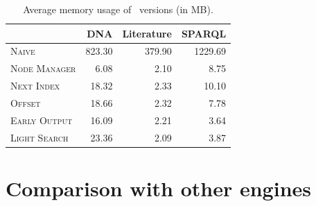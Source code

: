 \begin{table}[t]
	\begin{tabular}{l|rrr}
		                      & \textsf{DNA} & \textsf{Literature} &
		                      \textsf{SPARQL} \\
		\hline
		\textsc{Naive}        & 823.30        & 379.90               & 1229.69
		\\
		\textsc{Node Manager} & 6.08         & 2.10                 & 8.75 \\
		\textsc{Next Index}   & 18.32        & 2.33                & 10.10 \\
		\textsc{Offset}       & 18.66        & 2.32                & 7.78 \\
		\textsc{Early Output} & 16.09        & 2.21                & 3.64 \\
		\textsc{Light Search} & 23.36        & 2.09                & 3.87
	\end{tabular}
	\caption{Average memory usage of \rematch\ versions (in MB).}
	\label{tab-memory}
\end{table}

\section{Comparison with other engines}\label{ss:comp}


